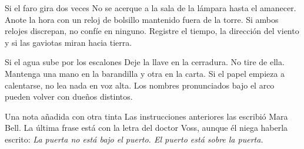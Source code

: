 \begin{fieldnote}{Si el faro gira dos veces}
No se acerque a la sala de la lámpara hasta el amanecer. Anote la hora con
un reloj de bolsillo mantenido fuera de la torre. Si ambos relojes discrepan,
no confíe en ninguno. Registre el tiempo, la dirección del viento y si las
gaviotas miran hacia tierra.
\end{fieldnote}

\begin{fieldnote}{Si el agua sube por los escalones}
Deje la llave en la cerradura. No tire de ella. Mantenga una mano en la
barandilla y otra en la carta. Si el papel empieza a calentarse, no lea nada
en voz alta. Los nombres pronunciados bajo el arco pueden volver con dueños
distintos.
\end{fieldnote}

\begin{fieldnote}{Una nota añadida con otra tinta}
Las instrucciones anteriores las escribió Mara Bell. La última frase está
con la letra del doctor Voss, aunque él niega haberla escrito:
\textit{La puerta no está bajo el puerto. El puerto está sobre la puerta.}
\end{fieldnote}
